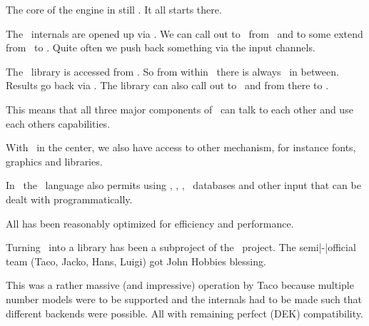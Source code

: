 


\startdocument
  [title={LUAMETAFUN},
   banner={the new interfaces},
   location={context\enspace {\bf 2021}\enspace meeting}]

\starttitle[title=Three subsystems]

\startitemize

\startitem
    The core of the engine in still \TEX. It all starts there.
\stopitem

\startitem
    The \TEX\ internals are opened up via \LUA. We can call out to \LUA\ from
    \TEX\ and to some extend from \LUA\ to \TEX. Quite often we push back
    something via the input channels.
\stopitem

\startitem
    The \METAPOST\ library is accessed from \LUA. So from within \TEX\ there is
    always \LUA\ in between. Results go back via \LUA. The library can also call
    out to \LUA\ and from there to \TEX.
\stopitem

\startitem
    This means that all three major components of \LUAMETATEX\ can talk to each
    other and use each others capabilities.
\stopitem

\startitem
    With \LUA\ in the center, we also have access to other mechanism, for instance
    fonts, graphics and libraries.
\stopitem

\startitem
    In \CONTEXT\ the \LUA\ language also permits using \XML, \JSON, \CSV, \SQL\
    databases and other input that can be dealt with programmatically.
\stopitem

\startitem
    All has been reasonably optimized for efficiency and performance.
\stopitem

\stopitemize

\stoptitle

\starttitle[title=The (\LUATEX) library]

\startitemize

\startitem
    Turning \METAPOST\ into a library has been a subproject of the \LUATEX\ project. The
    semi|-|official team (Taco, Jacko, Hans, Luigi) got John Hobbies blessing.
\stopitem

\startitem
    This was a rather massive (and impressive) operation by Taco because multiple
    number models were to be supported and the internals had to be made such that
    different backends were possible. All with remaining perfect (DEK) compatibility.
\stopitem

